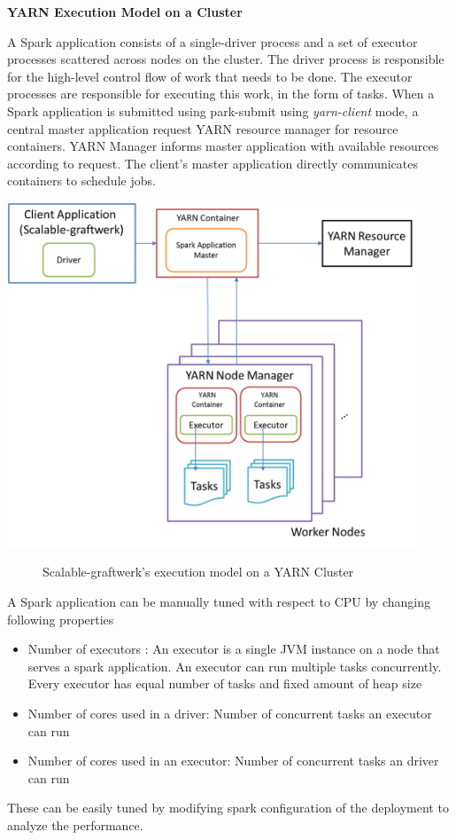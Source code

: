 \textbf{YARN Execution Model on a Cluster}

A Spark application consists of a single-driver process and a set of executor processes scattered across nodes on the cluster. The driver process  is responsible for the high-level control flow of work that needs to be done. The executor processes are responsible for executing this work, in the form of tasks. When a Spark application is submitted using park-submit using \textit{yarn-client} mode, a central master application request YARN resource manager for resource containers. YARN Manager informs master application with available resources according to request. The client's master application directly communicates containers to schedule jobs. 
\begin{center}
	\includegraphics[width=33em]{./Figures/scalable-graftwer-in-yarn-cluster}
	\begin{figure}[htbp]
    \caption{Scalable-graftwerk's execution model on a YARN Cluster}
    \label{fig:yarn-cluster-model}
	\end{figure}
\end{center}
A Spark application can be manually tuned with respect to CPU by changing following properties
\begin{itemize}
\item Number of executors : 	An executor is a single JVM instance on a node that serves a spark application. An executor can run multiple tasks concurrently. Every executor has equal number of tasks and fixed amount of heap size
\item Number of cores used in a driver: Number of concurrent tasks an executor can run
\item Number of cores used in an executor:  Number of concurrent tasks an driver can run
\end{itemize}
These can be easily tuned by modifying spark configuration of the deployment to analyze the performance. 

